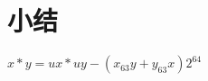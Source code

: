 
\section{小结}
{
    \begin{practicec}

    \end{practicec}

    \begin{practicec}
        $x * y = ux * uy - (x_{63}y + y_{63}x)2^{64}$
    \end{practicec}

    \begin{practicec}

    \end{practicec}

    \begin{practicec}

    \end{practicec}
}

